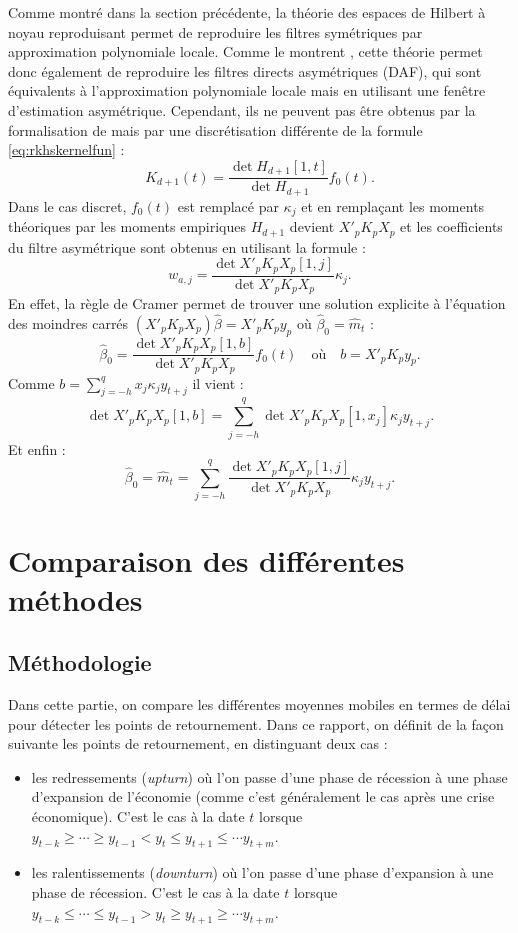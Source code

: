\documentclass[
  11pt,
  french,
  a4paper]{article}
\newcommand\1{\mathds{1}}
\begin{document}
Comme montré dans la section précédente, la théorie des espaces de Hilbert à noyau reproduisant permet de reproduire les filtres symétriques par approximation polynomiale locale.
Comme le montrent \textcite{LuatiProietti2011}, cette théorie permet donc également de reproduire les filtres directs asymétriques (DAF), qui sont équivalents à l'approximation polynomiale locale mais en utilisant une fenêtre d'estimation asymétrique.
Cependant, ils ne peuvent pas être obtenus par la formalisation de \textcite{dagumbianconcini2008} mais par une discrétisation différente de la formule \eqref{eq:rkhskernelfun} :
\[
K_{d+1}(t)=\frac{\det{H_{d+1}[1,t]}}{\det{H_{d+1}}}f_0(t).
\]
Dans le cas discret, \(f_0(t)\) est remplacé par \(\kappa_j\) et en remplaçant les moments théoriques par les moments empiriques \(H_{d+1}\) devient \(X'_pK_pX_p\) et les coefficients du filtre asymétrique sont obtenus en utilisant la formule :
\[
w_{a,j}=\frac{\det{X'_pK_pX_p[1,j]}
}{
\det{X'_pK_pX_p}
}\kappa_j.
\]
En effet, la règle de Cramer permet de trouver une solution explicite à l'équation des moindres carrés \((X'_pK_pX_p)\hat \beta=X'_pK_py_p\) où \(\hat \beta_0=\hat m_t\) :
\[
\hat \beta_0 = \frac{\det{X'_pK_pX_p[1,b]}}{\det{X'_pK_pX_p}}f_0(t)
\quad\text{où}\quad b=X'_pK_py_p.
\]
Comme \(b=\sum_{j=-h}^qx_j\kappa_jy_{t+j}\) il vient :
\[
\det{X'_pK_pX_p[1,b]} = \sum_{j=-h}^q\det{X'_pK_pX_p[1,x_j]}\kappa_jy_{t+j}.
\]
Et enfin :
\[
\hat \beta_0 = \hat m_t= \sum_{j=-h}^q\frac{\det{X'_pK_pX_p[1,j]}
}{
\det{X'_pK_pX_p}
}\kappa_j y_{t+j}.
\]

\hypertarget{sec-comparison}{%
\section{Comparaison des différentes méthodes}\label{sec-comparison}}

\hypertarget{muxe9thodologie}{%
\subsection{Méthodologie}\label{muxe9thodologie}}

Dans cette partie, on compare les différentes moyennes mobiles en termes de délai pour détecter les points de retournement.
Dans ce rapport, on définit de la façon suivante les points de retournement, en distinguant deux cas :

\begin{itemize}
\item
  les redressements (\emph{upturn}) où l'on passe d'une phase de récession à une phase d'expansion de l'économie (comme c'est généralement le cas après une crise économique).
  C'est le cas à la date \(t\) lorsque \(y_{t-k}\geq\cdots\geq y_{t-1}<y_t\leq y_{t+1}\leq\cdots y_{t+m}\).
\item
  les ralentissements (\emph{downturn}) où l'on passe d'une phase d'expansion à une phase de récession.
  C'est le cas à la date \(t\) lorsque \(y_{t-k}\leq\cdots\leq y_{t-1}>y_t\geq y_{t+1}\geq\cdots y_{t+m}\).
\end{itemize}
\end{document}
